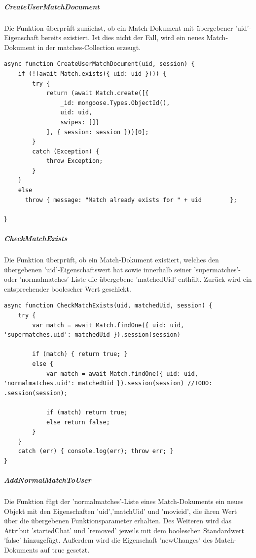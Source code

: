 \subparagraph{CreateUserMatchDocument}
Die Funktion überprüft zunächst, ob ein Match-Dokument mit übergebener 'uid'-Eigenschaft bereits existiert. Ist dies nicht der Fall, wird ein neues Match-Dokument in der matches-Collection erzeugt.

\begin{lstlisting}[caption=Match Service - CreateUserMatchDocument, label=lst:matchserviceCreateUserMatchDocument]
async function CreateUserMatchDocument(uid, session) {
    if (!(await Match.exists({ uid: uid }))) {
        try {
            return (await Match.create([{
                _id: mongoose.Types.ObjectId(),
                uid: uid,
                swipes: []}
            ], { session: session }))[0];
        }
        catch (Exception) {
            throw Exception;
        }
    }
    else 
      throw { message: "Match already exists for " + uid 		};
    
}
\end{lstlisting}

\subparagraph{CheckMatchExists}
Die Funktion überprüft, ob ein Match-Dokument existiert, welches den übergebenen 'uid'-Eigenschaftswert hat sowie innerhalb seiner 'supermatches'- oder 'normalmatches'-Liste die übergebene 'matchedUid' enthält. Zurück wird ein entsprechender boolescher Wert geschickt. 

\begin{lstlisting}[caption=Match Service - CreateUserMatchDocument, label=lst:matchserviceCreateUserMatchDocument]
async function CheckMatchExists(uid, matchedUid, session) {
    try {
        var match = await Match.findOne({ uid: uid, 'supermatches.uid': matchedUid }).session(session)

        if (match) { return true; }
        else {
            var match = await Match.findOne({ uid: uid, 'normalmatches.uid': matchedUid }).session(session) //TODO: .session(session);

            if (match) return true;
            else return false;
        }
    }
    catch (err) { console.log(err); throw err; }
}
\end{lstlisting}

\subparagraph{AddNormalMatchToUser}
Die Funktion fügt der 'normalmatches'-Liste eines Match-Dokuments ein neues Objekt mit den Eigenschaften 'uid','matchUid' und 'movieid', die ihren Wert über die übergebenen Funktionsparameter erhalten. Des Weiteren wird das Attribut 'startedChat' und 'removed' jeweils mit dem booleschen Standardwert 'false' hinzugefügt. Außerdem wird die Eigenschaft 'newChanges' des Match-Dokuments auf true gesetzt.

